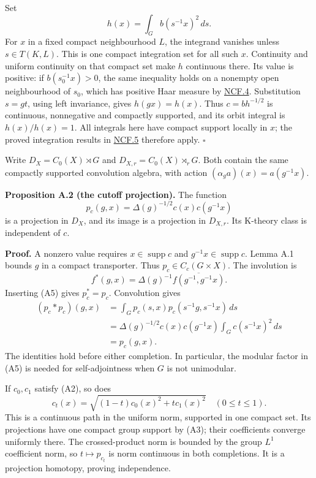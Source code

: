 \documentclass[
  11pt,
]{article}
\begin{document}
Set \[
h(x)=\int_G b(s^{-1}x)^2\,ds.
\tag{A4}
\] For \(x\) in a fixed compact neighbourhood \(L\), the integrand
vanishes unless \(s\in T(K,L)\). This is one compact integration set for
all such \(x\). Continuity and uniform continuity on that compact set
make \(h\) continuous there. Its value is positive: if
\(b(s_0^{-1}x)>0\), the same inequality holds on a nonempty open
neighbourhood of \(s_0\), which has positive Haar measure by
\href{supporting/noncompact-foundations/noncompact-foundations.html\#ncf-004}{NCF.4}.
Substitution \(s=gt\), using left invariance, gives \(h(gx)=h(x)\). Thus
\(c=b h^{-1/2}\) is continuous, nonnegative and compactly supported, and
its orbit integral is \(h(x)/h(x)=1\). All integrals here have compact
support locally in \(x\); the proved integration results in
\href{supporting/noncompact-foundations/noncompact-foundations.html\#ncf-005}{NCF.5}
therefore apply. \(\square\)

Write \(D_X=C_0(X)\rtimes G\) and \(D_{X,r}=C_0(X)\rtimes_rG\). Both
contain the same compactly supported convolution algebra, with action
\((\alpha_g a)(x)=a(g^{-1}x)\).

\textbf{Proposition A.2 (the cutoff projection).} The function \[
p_c(g,x)=\Delta(g)^{-1/2}c(x)c(g^{-1}x)
\tag{A5}
\] is a projection in \(D_X\), and its image is a projection in
\(D_{X,r}\). Its K-theory class is independent of \(c\).

\textbf{Proof.} A nonzero value requires \(x\in\operatorname{supp}c\)
and \(g^{-1}x\in\operatorname{supp}c\). Lemma A.1 bounds \(g\) in a
compact transporter. Thus \(p_c\in C_c(G\times X)\). The involution is
\[
f^*(g,x)=\Delta(g)^{-1}\overline{f(g^{-1},g^{-1}x)}.
\tag{A6}
\] Inserting (A5) gives \(p_c^*=p_c\). Convolution gives \[
\begin{aligned}
(p_c*p_c)(g,x)
&=\int_G p_c(s,x)p_c(s^{-1}g,s^{-1}x)\,ds\\
&=\Delta(g)^{-1/2}c(x)c(g^{-1}x)
       \int_G c(s^{-1}x)^2\,ds\\
&=p_c(g,x).
\end{aligned}
\tag{A7}
\] The identities hold before either completion. In particular, the
modular factor in (A5) is needed for self-adjointness when \(G\) is not
unimodular.

If \(c_0,c_1\) satisfy (A2), so does \[
c_t(x)=\sqrt{(1-t)c_0(x)^2+t c_1(x)^2}\quad(0\leq t\leq1).
\tag{A8}
\] This is a continuous path in the uniform norm, supported in one
compact set. Its projections have one compact group support by (A3);
their coefficients converge uniformly there. The crossed-product norm is
bounded by the group \(L^1\) coefficient norm, so \(t\mapsto p_{c_t}\)
is norm continuous in both completions. It is a projection homotopy,
proving independence.
\end{document}
